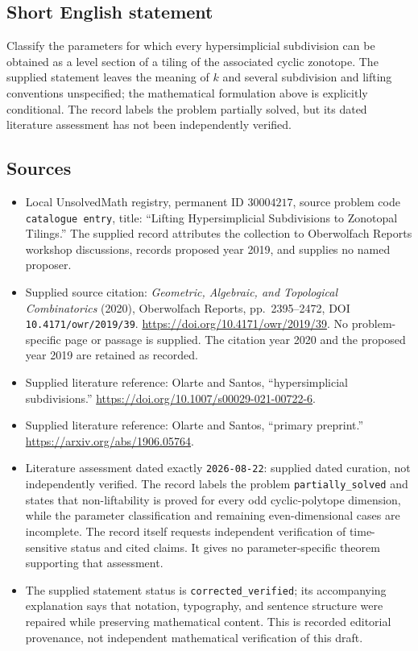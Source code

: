 \documentclass[11pt]{article}
\begin{document}
\subsection{Short English statement}
Classify the parameters for which every hypersimplicial subdivision can be obtained as a level section of a tiling of the associated cyclic zonotope. The supplied statement leaves the meaning of \(k\) and several subdivision and lifting conventions unspecified; the mathematical formulation above is explicitly conditional. The record labels the problem partially solved, but its dated literature assessment has not been independently verified.
\subsection{Sources}
\begin{itemize}
\item Local UnsolvedMath registry, permanent ID \(30004217\), source problem code \texttt{catalogue entry}, title: ``Lifting Hypersimplicial Subdivisions to Zonotopal Tilings.'' The supplied record attributes the collection to Oberwolfach Reports workshop discussions, records proposed year 2019, and supplies no named proposer.
\item Supplied source citation: \emph{Geometric, Algebraic, and Topological Combinatorics} (2020), Oberwolfach Reports, pp.\ 2395--2472, DOI \texttt{10.4171/owr/2019/39}. \url{https://doi.org/10.4171/owr/2019/39}. No problem-specific page or passage is supplied. The citation year 2020 and the proposed year 2019 are retained as recorded.
\item Supplied literature reference: Olarte and Santos, ``hypersimplicial subdivisions.'' \url{https://doi.org/10.1007/s00029-021-00722-6}.
\item Supplied literature reference: Olarte and Santos, ``primary preprint.'' \url{https://arxiv.org/abs/1906.05764}.
\item Literature assessment dated exactly \texttt{2026-08-22}: supplied dated curation, not independently verified. The record labels the problem \texttt{partially\_solved} and states that non-liftability is proved for every odd cyclic-polytope dimension, while the parameter classification and remaining even-dimensional cases are incomplete. The record itself requests independent verification of time-sensitive status and cited claims. It gives no parameter-specific theorem supporting that assessment.
\item The supplied statement status is \texttt{corrected\_verified}; its accompanying explanation says that notation, typography, and sentence structure were repaired while preserving mathematical content. This is recorded editorial provenance, not independent mathematical verification of this draft.
\end{itemize}
\end{document}

